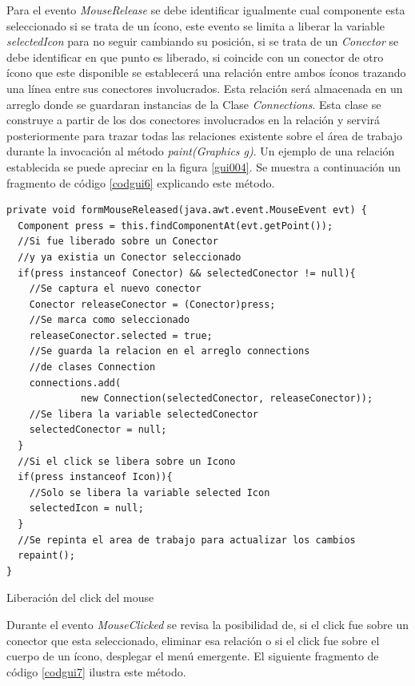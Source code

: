 Para el evento \textit{MouseRelease} se debe identificar igualmente cual componente esta seleccionado si se trata
de un \'icono, este evento se limita a liberar la variable \textit{selectedIcon} para no seguir cambiando su
posici\'on, si se trata de un \textit{Conector} se debe identificar en que punto es liberado, si coincide con un
conector de otro \'icono que este disponible se establecer\'a una relaci\'on entre ambos \'iconos trazando una
l\'inea entre sus conectores involucrados.   Esta relaci\'on ser\'a almacenada en un arreglo donde se guardaran
instancias de la Clase \textit{Connections}.  Esta clase se construye a partir de los dos conectores involucrados
en la relaci\'on y servir\'a posteriormente para trazar todas las relaciones existente sobre el \'area de trabajo
durante la invocaci\'on al m\'etodo \textit{paint(Graphics g)}.  Un ejemplo de una relaci\'on establecida se
puede apreciar en la figura \ref{gui004}.  Se muestra a continuaci\'on un fragmento de c\'odigo \ref{codgui6}
explicando este m\'etodo.\\

\begin{codigof}[t]
\begin{verbatim}
private void formMouseReleased(java.awt.event.MouseEvent evt) {
  Component press = this.findComponentAt(evt.getPoint());
  //Si fue liberado sobre un Conector 
  //y ya existia un Conector seleccionado
  if(press instanceof Conector) && selectedConector != null){
    //Se captura el nuevo conector
    Conector releaseConector = (Conector)press;
    //Se marca como seleccionado
    releaseConector.selected = true;
    //Se guarda la relacion en el arreglo connections 
    //de clases Connection
    connections.add(
             new Connection(selectedConector, releaseConector));
    //Se libera la variable selectedConector
    selectedConector = null;
  }
  //Si el click se libera sobre un Icono
  if(press instanceof Icon)){
    //Solo se libera la variable selected Icon
    selectedIcon = null;
  }
  //Se repinta el area de trabajo para actualizar los cambios
  repaint();
}
\end{verbatim}
\caption{Liberaci\'on del click del mouse}
\label{codgui6}
\end{codigof}

Durante el evento \textit{MouseClicked} se revisa la posibilidad de, si el click fue sobre un conector que esta
seleccionado, eliminar esa relaci\'on o si el click fue sobre el cuerpo de un \'icono, desplegar el men\'u
emergente. El siguiente fragmento de c\'odigo \ref{codgui7} ilustra este m\'etodo.\\

